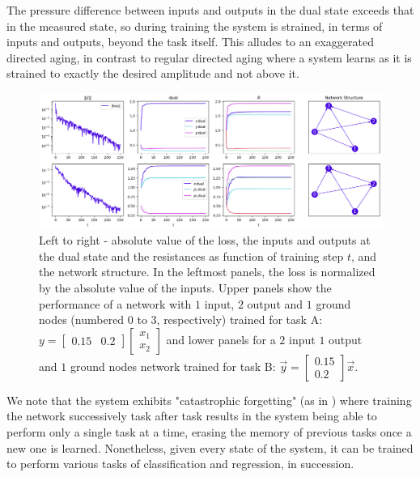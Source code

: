 \documentclass[%
 reprint,
 amsmath,amssymb,
 aps,
]{revtex4-2}
\begin{document}
    The pressure difference between inputs and outputs in the dual state exceeds that in the measured state, so during training the system is strained, in terms of inputs and outputs, beyond the task itself. This alludes to an exaggerated directed aging, in contrast to regular directed aging where a system learns as it is strained to exactly the desired amplitude and not above it.
    \begin{figure}[ht]
    \centerline{
    \includegraphics[width=\textwidth,height=\textheight,keepaspectratio]{Figures/performance_2_examples_4panels_mycolors.png}
    }
    \caption{Left to right - absolute value of the loss, the inputs and outputs at the dual state and the resistances as function of training step $t$, and the network structure. In the leftmost panels, the loss is normalized by the absolute value of the inputs. Upper panels show the performance of a network with $1$ input, $2$ output and $1$ ground nodes (numbered $0$ to $3$, respectively) trained for task A: $y=\left[\begin{array}{cc}0.15 & 0.2\end{array}\right]\left[\begin{array}{c} x_{1}\\x_{2}\end{array}\right]$ and lower panels for a $2$ input $1$ output and $1$ ground nodes network trained for task B: $\vec{y}=\left[\begin{array}{c}0.15\\0.2\end{array}\right]\vec{x}$.}
    \label{fig:variabs_in_t}
    \end{figure}
    We note that the system exhibits "catastrophic forgetting" (as in \cite{FRENCH1999128}) where training the network successively task after task results in the system being able to perform only a single task at a time, erasing the memory of previous tasks once a new one is learned. Nonetheless, given every state of the system, it can be trained to perform various tasks of classification and regression, in succession.
\end{document}
